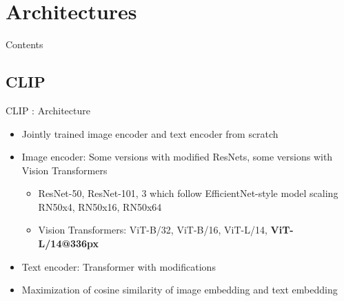 \documentclass[xcolor=dvipsnames]{beamer}
\begin{document}
\section{Architectures} %
\begin{frame}{Contents}
  \tableofcontents[sections={1-3}, currentsection]
  \tableofcontents[sections={4-6}]
\end{frame}


\subsection{CLIP} %
\begin{frame}{CLIP \parencite{radford2021learning}: Architecture}
  \begin{itemize}
    \item Jointly trained image encoder and text encoder from scratch
    \item Image encoder: Some versions with modified ResNets, some versions with Vision Transformers \parencite[ViT;][]{ImageT}
    \begin{itemize}
      \item ResNet-50, ResNet-101, 3 which follow EfficientNet-style model scaling RN50x4, RN50x16, RN50x64
      \item Vision Transformers: ViT-B/32, ViT-B/16, ViT-L/14, \textbf{ViT-L/14@336px}
    \end{itemize}
    \item Text encoder: Transformer with modifications
    \item Maximization of cosine similarity of image embedding and text embedding
  \end{itemize}
\end{frame}
\end{document}
